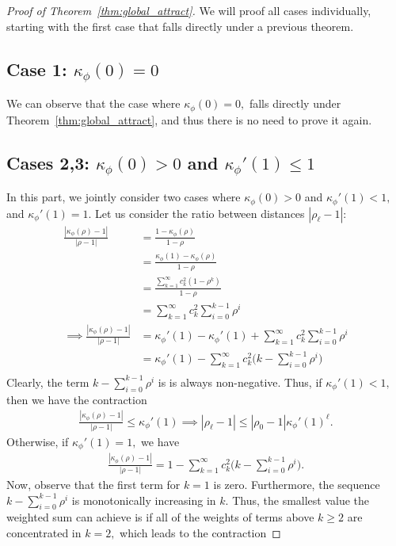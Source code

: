 \documentclass[twoside]{article}
\newcommand{\km}{\kappa_\phi}
\theoremstyle{definition}
\begin{document}
\begin{proof}[Proof of Theorem~\ref{thm:global_attract}]
We will proof all cases individually, starting with the first case that falls directly under a previous theorem. 

\subsection*{Case 1: $\km(0)=0$}
We can observe that the case where $\km(0)=0,$ falls directly under Theorem~\ref{thm:global_attract}, and thus there is no need to prove it again.

\subsection*{Cases 2,3: $\km(0)>0$ and $\km'(1)\le 1$} In this part, we jointly consider two cases where $\km(0)>0$ and $\km'(1) < 1,$ and $\km'(1)=1.$ Let us consider the ratio between distances $|\rho_\ell-1|$:
\begin{align*}
    \frac{|\km(\rho)-1|}{|\rho-1|} &= \frac{1-\km(\rho)}{1-\rho} \\
    &=\frac{\km(1)-\km(\rho)}{1-\rho}\\
    &=\frac{\sum_{k=1}^\infty c_k^2 (1-\rho^k)}{1-\rho}\\
    &=\sum_{k=1}^\infty c_k^2 \sum_{i=0}^{k-1}\rho^i\\
\implies \frac{|\km(\rho)-1|}{|\rho-1|} &=\km'(1)-\km'(1)+\sum_{k=1}^\infty c_k^2 \sum_{i=0}^{k-1} \rho^i\\
&= \km'(1)-\sum_{k=1}^\infty c_k^2 \big(k-\sum_{i=0}^{k-1} \rho^i\big)\\
\end{align*}
Clearly, the term $k-\sum_{i=0}^{k-1} \rho^i$ is is always non-negative. Thus, if $\km'(1)<1,$ then we have the contraction 
\begin{align*}
    \frac{|\km(\rho)-1|}{|\rho-1|} \le \km'(1) \implies |\rho_\ell-1| \le |\rho_0-1| \km'(1)^\ell.
\end{align*}
Otherwise, if $\km'(1)=1,$ we have 
\begin{align*}
    \frac{|\km(\rho)-1|}{|\rho-1|} = 1-\sum_{k=1}^\infty c_k^2 \big(k-\sum_{i=0}^{k-1} \rho^i\big).
\end{align*}
Now, observe that the first term for $k=1$ is zero. Furthermore, the sequence $k-\sum_{i=0}^{k-1}\rho^i$ is monotonically increasing in $k$. Thus, the smallest value the weighted sum can achieve is if all of the weights of terms above $k\ge 2$ are concentrated in $k=2,$ which leads to the contraction

\end{proof}
\end{document}
